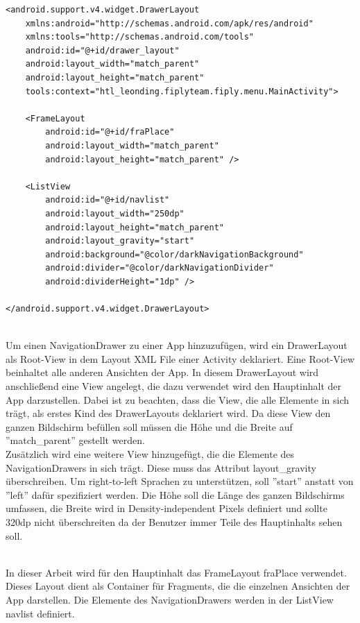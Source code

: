 \documentclass[FIPLY_base.tex]{subfiles}
\begin{document}
\newpage
\begin{lstlisting}
<android.support.v4.widget.DrawerLayout
	xmlns:android="http://schemas.android.com/apk/res/android"
	xmlns:tools="http://schemas.android.com/tools"
	android:id="@+id/drawer_layout"
	android:layout_width="match_parent"
	android:layout_height="match_parent"
	tools:context="htl_leonding.fiplyteam.fiply.menu.MainActivity">

	<FrameLayout
		android:id="@+id/fraPlace"
		android:layout_width="match_parent"
		android:layout_height="match_parent" />

	<ListView
		android:id="@+id/navlist"
		android:layout_width="250dp"
		android:layout_height="match_parent"
		android:layout_gravity="start"
		android:background="@color/darkNavigationBackground"
		android:divider="@color/darkNavigationDivider"
		android:dividerHeight="1dp" />

</android.support.v4.widget.DrawerLayout>
\end{lstlisting}
\ \\
Um einen NavigationDrawer zu einer App hinzuzufügen, wird ein DrawerLayout als Root-View in dem Layout XML File einer Activity deklariert. 
Eine Root-View beinhaltet alle anderen Ansichten der App. 
In diesem DrawerLayout wird anschließend eine View angelegt, die dazu verwendet wird den Hauptinhalt der App darzustellen.
Dabei ist zu beachten, dass die View, die alle Elemente in sich trägt, als erstes Kind des DrawerLayouts deklariert wird.
Da diese View den ganzen Bildschirm befüllen soll müssen die Höhe und die Breite auf ''match\_parent'' gestellt werden.
\ \\
Zusätzlich wird eine weitere View hinzugefügt, die die Elemente des NavigationDrawers in sich trägt. 
Diese muss das Attribut layout\_gravity überschreiben. 
Um right-to-left Sprachen zu unterstützen, soll ''start'' anstatt von ''left'' dafür spezifiziert werden. 
Die Höhe soll die Länge des ganzen Bildschirms umfassen, die Breite wird in Density-independent Pixels definiert und sollte 320dp nicht überschreiten da der Benutzer immer Teile des Hauptinhalts sehen soll. 

\ \\
In dieser Arbeit wird für den Hauptinhalt das FrameLayout fraPlace verwendet. 
Dieses Layout dient als Container für Fragments, die die einzelnen Ansichten der App darstellen.
Die Elemente des NavigationDrawers werden in der ListView navlist definiert.
\end{document}
